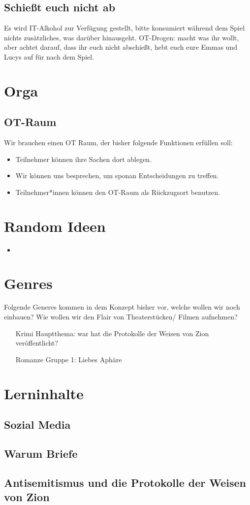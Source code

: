 \documentclass[12pt, a4paper, openany]{report}
\begin{document}
\section{Schießt euch nicht ab}
Es wird IT-Alkohol zur Verfügung gestellt, bitte konsumiert während dem Spiel nichts zusätzliches, was darüber hinausgeht.
OT-Drogen: macht was ihr wollt, aber achtet darauf, dass ihr euch nicht abschießt, hebt euch eure Emmas und Lucys auf für nach dem Spiel.

\chapter{Orga}

\section{OT-Raum}
Wir brauchen einen OT Raum, der bisher folgende Funktionen erfüllen soll:
\begin{itemize}
    \item Teilnehmer können ihre Sachen dort ablegen.
    \item Wir können uns besprechen, um sponan Entscheidungen zu treffen.
    \item Teilnehmer*innen können den OT-Raum als Rückzugsort benutzen. 
\end{itemize}

\chapter{Random Ideen}
\begin{itemize}
    \item 
\end{itemize}
\chapter{Genres}
Folgende Generes kommen in dem Konzept bisher vor, welche wollen wir noch einbauen? 
Wie wollen wir den Flair von Theaterstücken/ Filmen aufnehmen?
\begin{itemize}
    \item[Krimi] Hauptthema: war hat die Protokolle der Weisen von Zion veröffentlicht?
    \item[Romanze] Gruppe 1: Liebes Aphäre
\end{itemize}

\chapter{Lerninhalte}
\section{Sozial Media}
\section{Warum Briefe}
\section{Antisemitismus und die Protokolle der Weisen von Zion}

\printbibliography
\listoftodos
\end{document}
